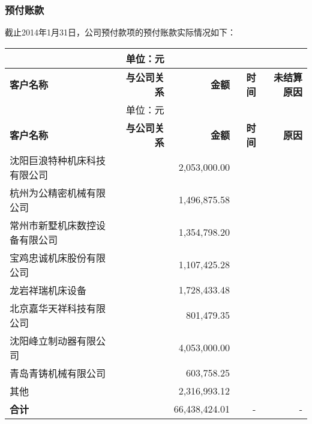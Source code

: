 \subsubsection{预付账款}
截止2014年1月31日，公司预付款项的预付账款实际情况如下：
\renewcommand*{\arraystretch}{0.6}
\setlength{\tabcolsep}{4pt}
\begin{longtable}{>{\scriptsize}l>{\scriptsize}r>{\scriptsize}r>{\scriptsize}r>{\scriptsize}r}
 \multicolumn{4}{c}{\footnotesize \bfseries 预付账款} & {\scriptsize 单位：元}\\
\hline\hline
\rowcolor{mycyan} {\bfseries \footnotesize  客户名称} & {\bfseries \footnotesize  与公司关系}\hspace{2ex} & {\bfseries \footnotesize   金额}\hspace{2ex} &  {\bfseries \footnotesize  时间}\hspace{4ex}      & {\bfseries \footnotesize  未结算原因} \\  \endfirsthead          %
 \multicolumn{4}{c}{\footnotesize \bfseries 预付账款（续表）} & {\scriptsize 单位：元}\\           %
\hline\hline
\rowcolor{mycyan} {\bfseries \footnotesize  客户名称} & {\bfseries \footnotesize  与公司关系}\hspace{2ex} & {\bfseries \footnotesize   金额}\hspace{2ex} &  {\bfseries \footnotesize  时间}\hspace{4ex}      & {\bfseries \footnotesize  原因} \\  \endhead                %
\hline
\endfoot
\hline   %
沈阳巨浪特种机床科技有限公司 &  &
2,053,000.00  &  & \\
杭州为公精密机械有限公司 &  &
1,496,875.58  &  & \\
常州市新墅机床数控设备有限公司 &  &
1,354,798.20  &  & \\
宝鸡忠诚机床股份有限公司 &  &
1,107,425.28  &  & \\
龙岩祥瑞机床设备 &  &
1,728,433.48  &  & \\
北京嘉华天祥科技有限公司 &  &
801,479.35  &  & \\
沈阳峰立制动器有限公司 &  &
4,053,000.00  &  & \\
青岛青铸机械有限公司 &  &
603,758.25  &  & \\
其他 &  &
2,316,993.12 &  & \\
\midrule
\bfseries 合计 &   & 66,438,424.01 & - & -\\
\bottomrule
\end{longtable}


